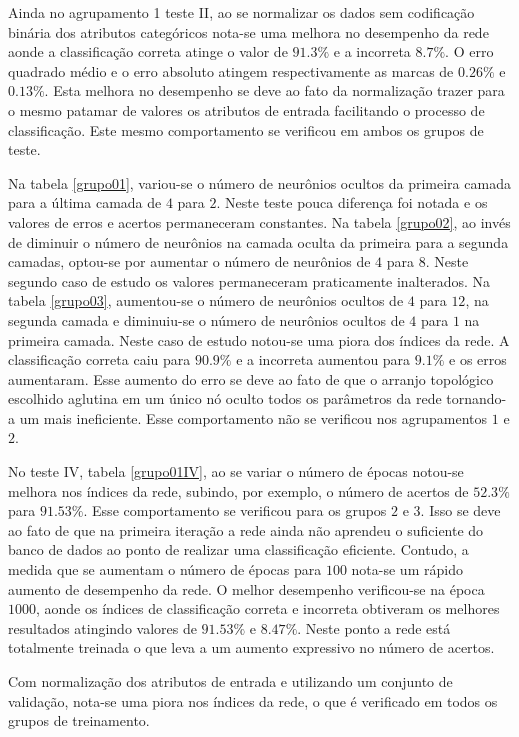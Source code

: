\documentclass[journal, a4paper]{IEEEtran}
\begin{document}
	Ainda no agrupamento 1 teste II, ao se normalizar os dados sem codificação binária dos atributos categóricos nota-se uma melhora no desempenho da rede aonde a classificação correta atinge o valor de $91.3\%$ e a incorreta $8.7\%$. O erro quadrado médio e o erro absoluto atingem respectivamente as marcas de $0.26\%$ e $0.13\%$. Esta melhora no desempenho se deve ao fato da normalização trazer para o mesmo patamar de valores os atributos de entrada facilitando o processo de classificação. Este mesmo comportamento se verificou em ambos os grupos de teste.
	
	Na tabela \ref{grupo01}, variou-se o número de neurônios ocultos da primeira camada para a última camada de $4$ para $2$. Neste teste pouca diferença foi notada e os valores de erros e acertos permaneceram constantes. Na tabela \ref{grupo02}, ao invés de diminuir o número de neurônios na camada oculta da primeira para a segunda camadas, optou-se por aumentar o número de neurônios de $4$ para $8$. Neste segundo caso de estudo os valores permaneceram praticamente inalterados. Na tabela \ref{grupo03}, aumentou-se o número de neurônios ocultos de $4$ para $12$, na segunda camada e diminuiu-se o número de neurônios ocultos de $4$ para $1$ na primeira camada. Neste caso de estudo notou-se uma piora dos índices da rede. A classificação correta caiu para $90.9\%$ e a incorreta aumentou para $9.1\%$ e os erros aumentaram. Esse aumento do erro se deve ao fato de que o arranjo topológico escolhido aglutina em um único nó oculto todos os parâmetros da rede tornando-a um mais ineficiente. Esse comportamento não se verificou nos agrupamentos $1$ e $2$.
	
	No teste IV, tabela \ref{grupo01IV}, ao se variar o número de épocas notou-se melhora nos índices da rede, subindo, por exemplo, o número de acertos de $52.3\%$ para $91.53\%$. Esse comportamento se verificou para os grupos $2$ e $3$. Isso se deve ao fato de que na primeira iteração a rede ainda não aprendeu o suficiente do banco de dados ao ponto de realizar uma classificação eficiente. Contudo, a medida que se aumentam o número de épocas para $100$ nota-se um rápido aumento de desempenho da rede. O melhor desempenho verificou-se na época $1000$, aonde os índices de classificação correta e incorreta obtiveram os melhores resultados atingindo valores de $91.53\%$ e $8.47\%$. Neste ponto a rede está totalmente treinada o que leva a um aumento expressivo no número de acertos.
	
	Com normalização dos atributos de entrada e utilizando um conjunto de validação, nota-se uma piora nos índices da rede, o que é verificado em todos os grupos de treinamento. 
	 
\end{document}
